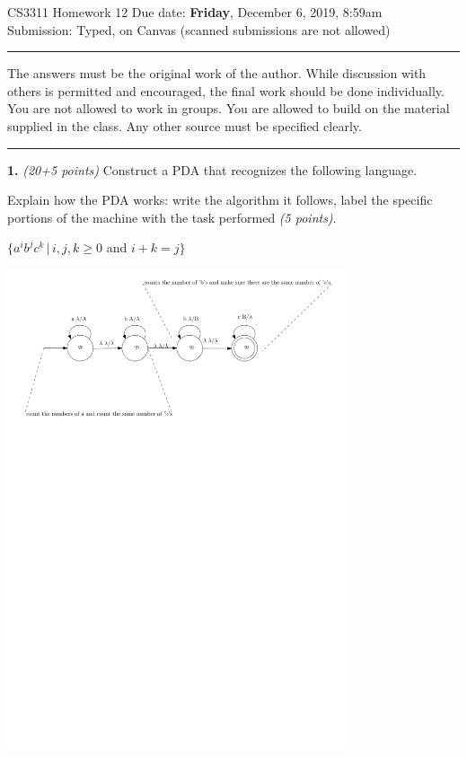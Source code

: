 \documentclass[12pt]{article}
\begin{document}
{\large CS3311 Homework 12} \hfill
Due date: {\bf Friday}, December 6, 2019, 8:59am\\
\hfill
Submission: Typed, on Canvas (scanned submissions are not allowed)
\vspace{-0.1in}

\rule{\textwidth}{0.5mm}
\begin{small}
The answers must be the original work of the author.  While discussion
with others is permitted and encouraged, the final work should be done
individually. You are not allowed to work in groups.  You are allowed to
build on the material supplied in the class. Any other source must be
specified clearly.
\end{small}
\rule{\textwidth}{0.5mm}

{\bf 1.} {\em (20+5 points)}
Construct a PDA that recognizes the following language.

Explain how the PDA works: write the algorithm it
follows, label the specific portions of the machine with the task
performed {\em (5 points)}.

$\{ a^i b^j c^k  \,|\, i,j,k \geq 0$ and $i + k = j \}$


\begin{center}
\includegraphics[width=0.75\textwidth]{PDA1.pdf}
\end{center}
\end{document}
